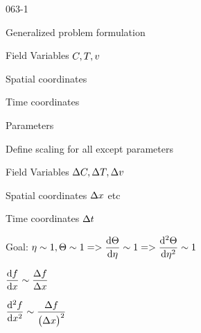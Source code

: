 \begin{mitframe}{063-1}
\begin{listone}
	\item Generalized problem formulation
    	\begin{listtwo}
        	\item Field Variables $\conc,\Temp, \vvel$
            \item Spatial coordinates
            \item Time coordinates
            \item Parameters
        \end{listtwo}
    \item Define scaling for all except parameters
    	\begin{listtwo}
        	\item Field Variables $\iipf\conc, \iipf\Temp, \iipf\vvel$
            \item Spatial coordinates $\iipf\disp$ etc
            \item Time coordinates $\iipf\timet$
        \end{listtwo}
    \item Goal: $\intrinsvisc\sim{1}, \dimltemp\sim{1}=>\dfrac{\mathrm{d}\dimltemp}{\mathrm{d}\intrinsvisc}\sim{1}=>\dfrac{\mathrm{d}^2\dimltemp}{\mathrm{d}\intrinsvisc^2}\sim{1}$
    \item $\dfrac{\mathrm{d}\fug}{\mathrm{d}\disp}\sim\dfrac{\iipf\fug}{\iipf\disp}$
    \item $\dfrac{\mathrm{d}^2\fug}{\mathrm{d}\disp^2}\sim\dfrac{\iipf\fug}{\big(\iipf\disp\big)^2}$
\end{listone}        
\end{mitframe}